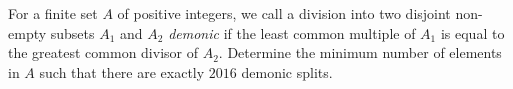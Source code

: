 For a finite set $A$ of positive integers, we call a division into two disjoint
non-empty subsets $A_1$ and $A_2$ \emph{demonic} if the least common
multiple of $A_1$ is equal to the greatest common divisor of $A_2$.
Determine the minimum number of elements in $A$ such that there are exactly $2016$ demonic splits.
